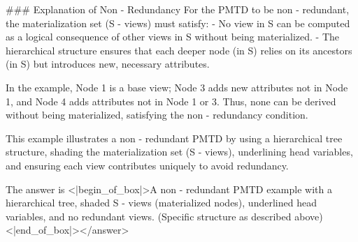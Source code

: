 ### Explanation of Non - Redundancy  
For the PMTD to be non - redundant, the materialization set (S - views) must satisfy:  
- No view in S can be computed as a logical consequence of other views in S without being materialized.  
- The hierarchical structure ensures that each deeper node (in S) relies on its ancestors (in S) but introduces new, necessary attributes.  

In the example, Node 1 is a base view; Node 3 adds new attributes not in Node 1, and Node 4 adds attributes not in Node 1 or 3. Thus, none can be derived without being materialized, satisfying the non - redundancy condition.  


This example illustrates a non - redundant PMTD by using a hierarchical tree structure, shading the materialization set (S - views), underlining head variables, and ensuring each view contributes uniquely to avoid redundancy.  

The answer is <|begin_of_box|>A non - redundant PMTD example with a hierarchical tree, shaded S - views (materialized nodes), underlined head variables, and no redundant views. (Specific structure as described above)<|end_of_box|></answer>